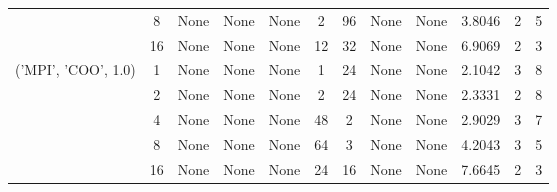 \begin{tabular}{cccccccccccc}
& 8& None& None& None& 2& 96& None& None& 3.8046& 2& 5\\
& 16& None& None& None& 12& 32& None& None& 6.9069& 2& 3\\
\hline
\multirow{5}{*}{('MPI', 'COO', 1.0)}& 1& None& None& None& 1& 24& None& None& 2.1042& 3& 8\\
& 2& None& None& None& 2& 24& None& None& 2.3331& 2& 8\\
& 4& None& None& None& 48& 2& None& None& 2.9029& 3& 7\\
& 8& None& None& None& 64& 3& None& None& 4.2043& 3& 5\\
& 16& None& None& None& 24& 16& None& None& 7.6645& 2& 3\\
\hline
\end{tabular}
